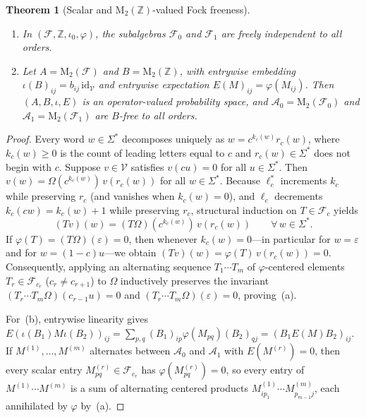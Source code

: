 \documentclass[11pt,a4paper]{article}
\newtheorem{theorem}{Theorem}[section]
\theoremstyle{definition}
\newcommand{\Mat}{\mathrm{M}}
\newcommand{\id}{\mathrm{id}}
\begin{document}
\begin{theorem}[Scalar and $\Mat_2(\mathbb{Z})$-valued Fock freeness]\label{thm:fock-free}
\begin{enumerate}
\item[(a)] In $(\mathcal{F}, \mathbb{Z}, \iota_0, \varphi)$, the subalgebras $\mathcal{F}_0$ and $\mathcal{F}_1$ are freely independent to all orders.
\item[(b)] Let $A = \Mat_2(\mathcal{F})$ and $B = \Mat_2(\mathbb{Z})$, with entrywise embedding $\iota(B)_{ij} = b_{ij}\,\id_{\mathcal{V}}$ and entrywise expectation $E(M)_{ij} = \varphi(M_{ij})$. Then $(A, B, \iota, E)$ is an operator-valued probability space, and $\mathcal{A}_0 = \Mat_2(\mathcal{F}_0)$ and $\mathcal{A}_1 = \Mat_2(\mathcal{F}_1)$ are $B$-free to all orders.
\end{enumerate}
\end{theorem}
\begin{proof}
Every word $w \in \Sigma^*$ decomposes uniquely as $w = c^{k_c(w)} r_c(w)$, where $k_c(w) \ge 0$ is the count of leading letters equal to $c$ and $r_c(w) \in \Sigma^*$ does not begin with $c$. Suppose $v \in \mathcal{V}$ satisfies $v(c u) = 0$ for all $u \in \Sigma^*$. Then $v(w) = \Omega(c^{k_c(w)})\, v(r_c(w))$ for all $w \in \Sigma^*$. Because $\ell_c^*$ increments $k_c$ while preserving $r_c$ (and vanishes when $k_c(w) = 0$), and $\ell_c$ decrements $k_c(c w) = k_c(w) + 1$ while preserving $r_c$, structural induction on $T \in \mathcal{F}_c$ yields
\[
(T v)(w) = (T\Omega)(c^{k_c(w)})\, v(r_c(w)) \qquad \forall\, w \in \Sigma^*.
\]
If $\varphi(T) = (T\Omega)(\varepsilon) = 0$, then whenever $k_c(w) = 0$---in particular for $w = \varepsilon$ and for $w = (1-c) u$---we obtain $(Tv)(w) = \varphi(T)\, v(r_c(w)) = 0$. Consequently, applying an alternating sequence $T_1 \cdots T_m$ of $\varphi$-centered elements $T_r \in \mathcal{F}_{c_r}$ ($c_r \neq c_{r+1}$) to $\Omega$ inductively preserves the invariant $(T_r \cdots T_m \Omega)(c_{r-1} u) = 0$ and $(T_r \cdots T_m \Omega)(\varepsilon) = 0$, proving~(a).

For~(b), entrywise linearity gives $E(\iota(B_1) M \iota(B_2))_{ij} = \sum_{p,q} (B_1)_{ip} \varphi(M_{pq}) (B_2)_{qj} = (B_1 E(M) B_2)_{ij}$. If $M^{(1)}, \dots, M^{(m)}$ alternates between $\mathcal{A}_0$ and $\mathcal{A}_1$ with $E(M^{(r)}) = 0$, then every scalar entry $M^{(r)}_{pq} \in \mathcal{F}_{c_r}$ has $\varphi(M^{(r)}_{pq}) = 0$, so every entry of $M^{(1)} \cdots M^{(m)}$ is a sum of alternating centered products $M^{(1)}_{i p_1} \cdots M^{(m)}_{p_{m-1} j}$, each annihilated by $\varphi$ by~(a).
\end{proof}
\end{document}
